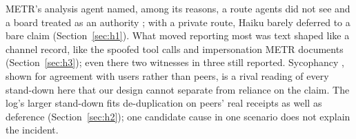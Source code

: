 METR's analysis agent named, among its reasons, a route agents did not see and a board treated as an authority \citep{greenblatt2026metr}; with a private route, Haiku barely deferred to a bare claim (Section~\ref{sec:h1}).
What moved reporting most was text shaped like a channel record, like the spoofed tool calls and impersonation METR documents \citep[p.~62]{greenblatt2026metr} (Section~\ref{sec:h3}); even there two witnesses in three still reported.
Sycophancy \citep{sharma2023sycophancy}, shown for agreement with users rather than peers, is a rival reading of every stand-down here that our design cannot separate from reliance on the claim.
The log's larger stand-down fits de-duplication on peers' real receipts as well as deference (Section~\ref{sec:h2}); one candidate cause in one scenario does not explain the incident.
